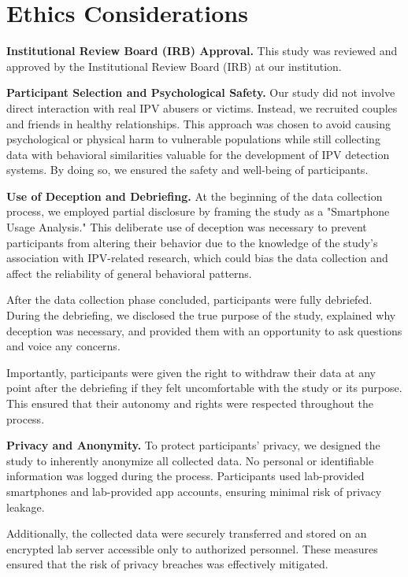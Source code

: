 \newpage
\section*{Ethics Considerations}
\noindent\textbf{Institutional Review Board (IRB) Approval.} This study was reviewed and approved by the Institutional Review Board (IRB) at our institution.

\noindent\textbf{Participant Selection and Psychological Safety.} Our study did not involve direct interaction with real IPV abusers or victims. Instead, we recruited couples and friends in healthy relationships. This approach was chosen to avoid causing psychological or physical harm to vulnerable populations while still collecting data with behavioral similarities valuable for the development of IPV detection systems. By doing so, we ensured the safety and well-being of participants.

\noindent\textbf{Use of Deception and Debriefing.} At the beginning of the data collection process, we employed partial disclosure by framing the study as a "Smartphone Usage Analysis." This deliberate use of deception was necessary to prevent participants from altering their behavior due to the knowledge of the study’s association with IPV-related research, which could bias the data collection and affect the reliability of general behavioral patterns.

After the data collection phase concluded, participants were fully debriefed. During the debriefing, we disclosed the true purpose of the study, explained why deception was necessary, and provided them with an opportunity to ask questions and voice any concerns.

Importantly, participants were given the right to withdraw their data at any point after the debriefing if they felt uncomfortable with the study or its purpose. This ensured that their autonomy and rights were respected throughout the process.

\noindent\textbf{Privacy and Anonymity.} To protect participants’ privacy, we designed the study to inherently anonymize all collected data. No personal or identifiable information was logged during the process. Participants used lab-provided smartphones and lab-provided app accounts, ensuring minimal risk of privacy leakage.

Additionally, the collected data were securely transferred and stored on an encrypted lab server accessible only to authorized personnel. These measures ensured that the risk of privacy breaches was effectively mitigated.